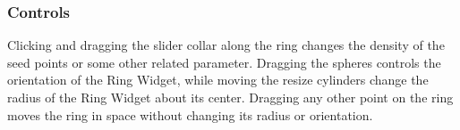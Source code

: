 \subsubsection{Controls} Clicking and dragging the slider collar along the
ring changes the density of the seed points or some other related
parameter.  Dragging the spheres controls the orientation of the Ring
Widget, while moving the resize cylinders change the radius of the Ring
Widget about its center.  Dragging any other point on the ring moves the
ring in space without changing its radius or orientation.
